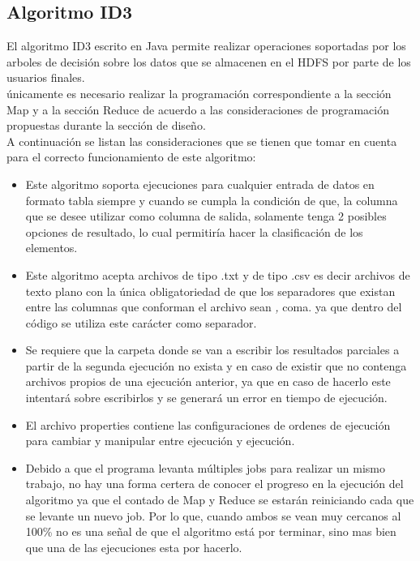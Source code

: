 \subsection{Algoritmo ID3}
El algoritmo ID3 escrito en Java permite realizar operaciones soportadas por los arboles de decisión sobre los datos que se almacenen en el HDFS por parte de los usuarios finales. \\
únicamente es necesario realizar la programación correspondiente a la sección Map y a la sección Reduce de acuerdo a las consideraciones de programación propuestas durante la sección de diseño. 
\\
A continuación se listan las consideraciones que se tienen que tomar en cuenta para el correcto funcionamiento de este algoritmo:
\begin{itemize}
 \item Este algoritmo soporta ejecuciones para cualquier entrada de datos en formato tabla siempre y cuando se cumpla la condición de que, la columna que se desee utilizar como columna de salida, solamente tenga 2 posibles opciones de resultado, lo cual permitiría hacer la clasificación de los elementos. \\
 \item Este algoritmo acepta archivos de tipo .txt y de tipo .csv es decir archivos de texto plano con la única obligatoriedad de que los separadores que existan entre las columnas que conforman el archivo sean \emph{,} coma. ya que dentro del código se utiliza este carácter como separador.\\
 \item Se requiere que la carpeta donde se van a escribir los resultados parciales a partir de la segunda ejecución no exista y en caso de existir que no contenga archivos propios de una ejecución anterior, ya que en caso de hacerlo este intentará sobre escribirlos y se generará un error en tiempo de ejecución.
 \item El archivo properties contiene las configuraciones de ordenes de ejecución para cambiar y manipular entre ejecución y ejecución. 
 \item Debido a que el programa levanta múltiples jobs para realizar un mismo trabajo, no hay una forma certera de conocer el progreso en la ejecución del algoritmo ya que el contado de Map y Reduce se estarán reiniciando cada que se levante un nuevo job. Por lo que, cuando ambos se vean muy cercanos al 100\% no es una señal de que el algoritmo está por terminar, sino mas bien que una de las ejecuciones esta por hacerlo.
\end{itemize}
